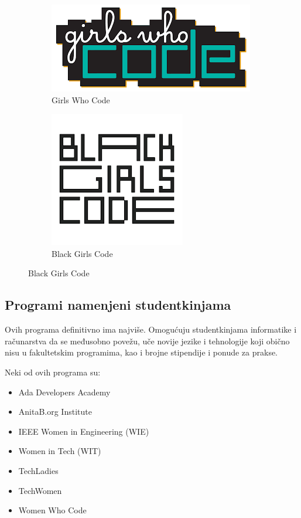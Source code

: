 \documentclass[12pt]{article}
\begin{document}
\begin{figure}[htp]
    \centering
    \begin{subfigure}{.5\textwidth}
        \centering
        \includegraphics[width=0.5\linewidth]{gwc.png}
        \caption{Girls Who Code}
    \end{subfigure}

    \begin{subfigure}{.5\textwidth}
    \centering
    \includegraphics[width=0.5\linewidth]{gbc.png}
    \caption{Black Girls Code}
    \end{subfigure}
\end{figure}

\subsection{Programi namenjeni studentkinjama}

Ovih programa definitivno ima najviše. Omogućuju studentkinjama informatike i računarstva da se međusobno povežu, uče novije jezike i tehnologije koji obično nisu u fakultetskim programima, kao i brojne stipendije i ponude za prakse.

Neki od ovih programa su:
\begin{itemize}
    \item Ada Developers Academy
    \item AnitaB.org Institute
    \item IEEE Women in Engineering (WIE)
    \item Women in Tech (WIT)
    \item TechLadies
    \item TechWomen
    \item Women Who Code
\end{itemize}
\end{document}
